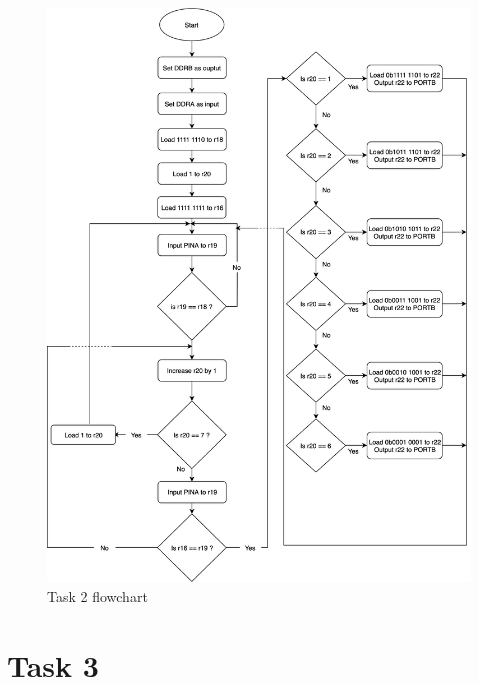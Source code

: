 \documentclass[a4paper,12pt]{article}
\begin{document}
\begin{figure}
\begin{center}
\includegraphics[width=\textwidth/1]{flowchart/task2_flowchart.png}
\end{center}
\caption{Task 2 flowchart}
\label{task2}
\end{figure}

\break

\section{Task 3}

\lstset{style=Asm}
\end{document}
